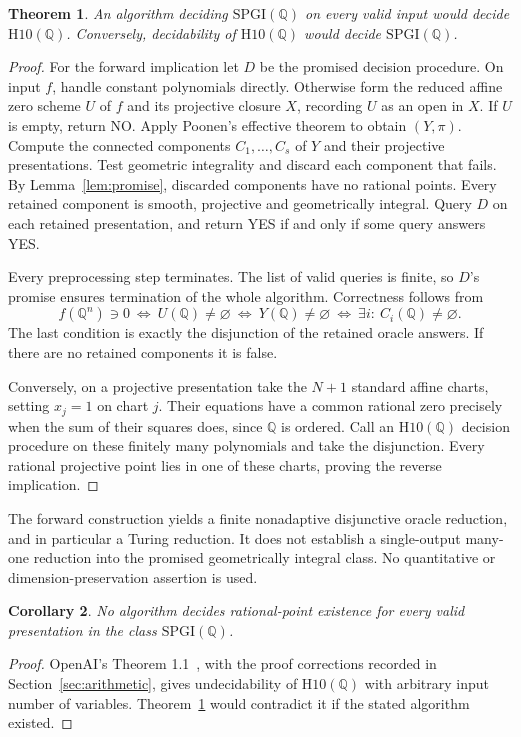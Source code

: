 \documentclass[11pt]{article}
\newtheorem{theorem}{Theorem}
\newtheorem{corollary}[theorem]{Corollary}
\newcommand{\Q}{\mathbb Q}
\begin{document}
\begin{theorem}\label{thm:transfer}
An algorithm deciding $\mathrm{SPGI}(\Q)$ on every valid input would
decide $\mathrm{H10}(\Q)$. Conversely, decidability of
$\mathrm{H10}(\Q)$ would decide $\mathrm{SPGI}(\Q)$.
\end{theorem}
\begin{proof}
For the forward implication let $D$ be the promised decision procedure.
On input $f$, handle constant polynomials directly. Otherwise form the
reduced affine zero scheme $U$ of $f$ and its projective closure $X$,
recording $U$ as an open in $X$. If $U$ is empty, return NO.
Apply Poonen's effective theorem to obtain $(Y,\pi)$.
Compute the connected components $C_1,\ldots,C_s$ of $Y$ and their
projective presentations. Test geometric integrality and discard each
component that fails. By Lemma~\ref{lem:promise}, discarded components
have no rational points. Every retained component is smooth, projective
and geometrically integral. Query $D$ on each retained presentation,
and return YES if and only if some query answers YES.

Every preprocessing step terminates. The list of valid queries is finite,
so $D$'s promise ensures termination of the whole algorithm. Correctness
follows from
\[
 f(\Q^n)\ni0
 \ \Longleftrightarrow\ U(\Q)\ne\varnothing
 \ \Longleftrightarrow\ Y(\Q)\ne\varnothing
 \ \Longleftrightarrow\ \exists i:\ C_i(\Q)\ne\varnothing.
\]
The last condition is exactly the disjunction of the retained oracle answers.
If there are no retained components it is false.

Conversely, on a projective presentation take the $N+1$ standard affine
charts, setting $x_j=1$ on chart $j$. Their equations have a common rational
zero precisely when the sum of their squares does, since $\Q$ is ordered.
Call an $\mathrm{H10}(\Q)$ decision procedure on these finitely many
polynomials and take the disjunction. Every rational projective point lies
in one of these charts, proving the reverse implication.
\end{proof}

The forward construction yields a finite nonadaptive disjunctive oracle
reduction, and in particular a Turing reduction. It does not establish a
single-output many-one reduction into the promised geometrically integral
class. No quantitative or dimension-preservation assertion is used.

\begin{corollary}\label{cor:undecidable}
No algorithm decides rational-point existence for every valid presentation
in the class $\mathrm{SPGI}(\Q)$.
\end{corollary}
\begin{proof}
OpenAI's Theorem 1.1~\cite{OpenAI}, with the proof corrections recorded
in Section~\ref{sec:arithmetic}, gives undecidability of $\mathrm{H10}(\Q)$
with arbitrary input number of variables. Theorem~\ref{thm:transfer}
would contradict it if the stated algorithm existed.
\end{proof}
\end{document}
